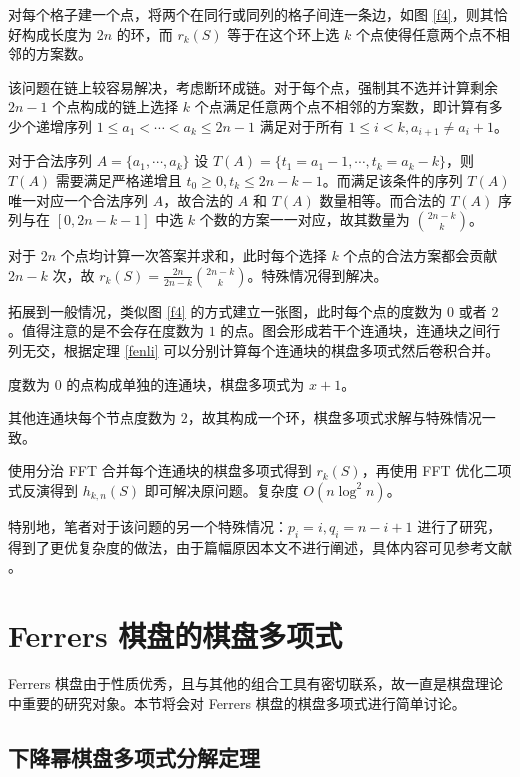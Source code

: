\documentclass{noithesis}
\begin{document}
	对每个格子建一个点，将两个在同行或同列的格子间连一条边，如图 \ref{f4}，则其恰好构成长度为 $2n$ 的环，而 $r_k(S)$ 等于在这个环上选 $k$ 个点使得任意两个点不相邻的方案数。
	
	该问题在链上较容易解决，考虑断环成链。对于每个点，强制其不选并计算剩余 $2n-1$ 个点构成的链上选择 $k$ 个点满足任意两个点不相邻的方案数，即计算有多少个递增序列 $1 \leq a_1 < \cdots < a_k \leq 2n-1$ 满足对于所有 $1 \leq i < k,a_{i+1} \neq a_i + 1$。
	
	对于合法序列 $A = \{a_1,\cdots,a_k\}$ 设 $T(A) = \{t_1 = a_1-1,\cdots,t_k = a_k-k\}$，则 $T(A)$ 需要满足严格递增且 $t_0 \geq 0,t_k \leq 2n-k-1$。而满足该条件的序列 $T(A)$ 唯一对应一个合法序列 $A$，故合法的 $A$ 和 $T(A)$ 数量相等。而合法的 $T(A)$ 序列与在 $[0,2n-k-1]$ 中选 $k$ 个数的方案一一对应，故其数量为 $\binom{2n-k}{k}$。
	
	对于 $2n$ 个点均计算一次答案并求和，此时每个选择 $k$ 个点的合法方案都会贡献 $2n-k$ 次，故 $r_k(S) = \frac{2n}{2n-k}\binom{2n-k}{k}$。特殊情况得到解决。
	
	拓展到一般情况，类似图 \ref{f4} 的方式建立一张图，此时每个点的度数为 $0$ 或者 $2$。值得注意的是不会存在度数为 $1$ 的点。图会形成若干个连通块，连通块之间行列无交，根据定理 \ref{fenli} 可以分别计算每个连通块的棋盘多项式然后卷积合并。
	
	度数为 $0$ 的点构成单独的连通块，棋盘多项式为 $x+1$。
	
	其他连通块每个节点度数为 $2$，故其构成一个环，棋盘多项式求解与特殊情况一致。
	
	使用分治 FFT 合并每个连通块的棋盘多项式得到 $r_k(S)$，再使用 FFT 优化二项式反演得到 $h_{k,n}(S)$ 即可解决原问题。复杂度 $O(n \log^2 n)$。 
	
	特别地，笔者对于该问题的另一个特殊情况：$p_i = i , q_i = n-i+1$ 进行了研究，得到了更优复杂度的做法，由于篇幅原因本文不进行阐述，具体内容可见参考文献 \cite{psj}。
	
	\section{Ferrers 棋盘的棋盘多项式}
	
	Ferrers 棋盘由于性质优秀，且与其他的组合工具有密切联系，故一直是棋盘理论中重要的研究对象。本节将会对 Ferrers 棋盘的棋盘多项式进行简单讨论。
	
	\subsection{下降幂棋盘多项式分解定理}
	
\end{document}
